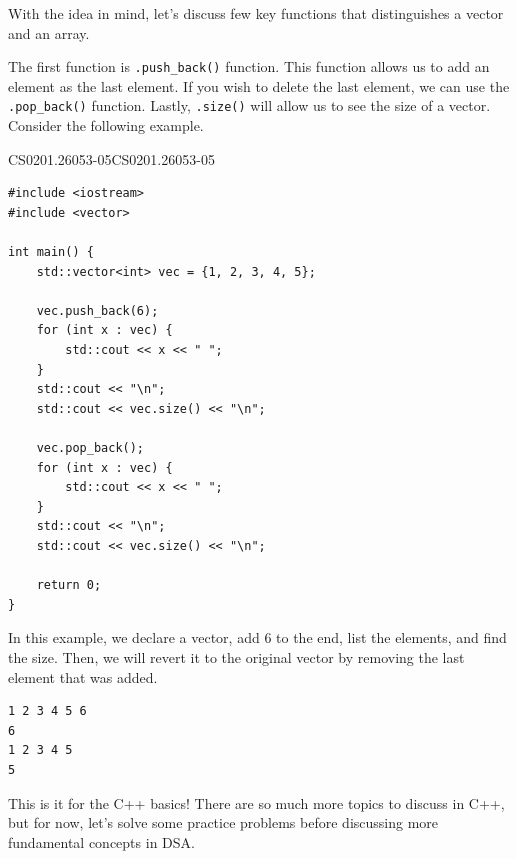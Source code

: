 \documentclass[../../../main.tex]{subfiles}
\begin{document}
With the idea in mind, let's discuss few key functions that
distinguishes a vector and an array.

The first function is \verb|.push_back()| function. This function
allows us to add an element as the last element. If you wish to
delete the last element, we can use the \verb|.pop_back()| function.
Lastly, \verb|.size()| will allow us to see the size of a vector.
Consider the following example.

\begin{cppbox}{CS0201.26053-05}{CS0201.26053-05}
\begin{lstlisting}[style=cppstyle]
#include <iostream>
#include <vector>

int main() {
    std::vector<int> vec = {1, 2, 3, 4, 5};
    
    vec.push_back(6);
    for (int x : vec) {
        std::cout << x << " ";
    }
    std::cout << "\n";
    std::cout << vec.size() << "\n";

    vec.pop_back();
    for (int x : vec) {
        std::cout << x << " ";
    }
    std::cout << "\n";
    std::cout << vec.size() << "\n";

    return 0;
}
\end{lstlisting}
\end{cppbox}

In this example, we declare a vector, add $6$ to the end, list the
elements, and find the size. Then, we will revert it to the original
vector by removing the last element that was added.

\begin{outputbox}
\begin{lstlisting}[style=basic]
1 2 3 4 5 6
6
1 2 3 4 5
5
\end{lstlisting}
\end{outputbox}

This is it for the C++ basics! There are so much more topics to
discuss in C++, but for now, let's solve some practice problems
before discussing more fundamental concepts in DSA.
\end{document}
